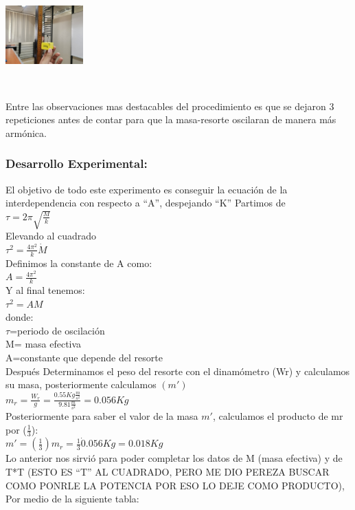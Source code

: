 \documentclass[10pt]{article}
\begin{document}
\begin{multicols}{2}
\begin{center}
\end{center}
\begin{center}
	\includegraphics[width=3cm, height=4cm]{Imagenes/350gr.jpeg}
\end{center}
Entre las observaciones mas destacables del procedimiento es que se dejaron 3 repeticiones antes de contar para que la masa-resorte oscilaran de manera más armónica.
\subsubsection{Desarrollo Experimental:}
El objetivo de todo este experimento es conseguir la ecuación de la interdependencia con respecto a “A”, despejando “K”
Partimos de \\ $\tau= 2\pi \sqrt{\frac{M}{k}}$\\
Elevando al cuadrado \\
$\tau^{2}=\frac{4\pi^{2}}{k}\dot M$\\
Definimos la constante de A como:\\
$A=\frac{4\pi^{2}}{k}$\\
Y al final tenemos: \\
$\tau^{2}=AM$\\
donde:\\
$\tau$=periodo de oscilación\\
M= masa efectiva\\
A=constante que depende del resorte\\
Después Determinamos el peso del resorte con el dinamómetro (Wr) y calculamos su masa, posteriormente calculamos $(m\prime)$\\
$m_{r}=\frac{W_{r}}{g}=\frac{0.55Kg\frac{m}{s^{2}}}{9.81\frac{m}{s^{2}}}=0.056Kg$\\
Posteriormente para saber el valor de la masa $m\prime$, calculamos el producto de mr por ($\frac{1}{3}$):\\
$m\prime=(\frac{1}{3})m_{r}=\frac{1}{3}\dot 0.056Kg=0.018Kg$\\
Lo anterior nos sirvió para poder completar los datos de M (masa efectiva) y de T*T (ESTO ES “T” AL CUADRADO, PERO ME DIO PEREZA BUSCAR COMO PONRLE LA POTENCIA POR ESO LO DEJE COMO PRODUCTO), \\ Por medio de la siguiente tabla:



\end{multicols}
\end{document}
